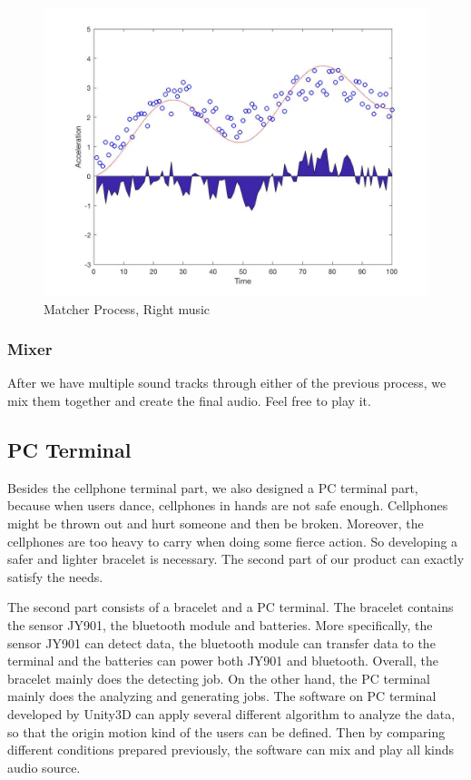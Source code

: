 \begin{figure}[H]
\centering
\includegraphics[width=\widthOfMatcherFigure]{figWR/matcher2}
\caption{Matcher Process, Right music}
\label{matcherStep1}
\end{figure}

\subsubsection{Mixer}

   After we have multiple sound tracks through either of the previous process,
   we mix them together and create the final audio. Feel free to play it.

\subsection{PC Terminal}

Besides the cellphone terminal part, we also designed a PC terminal part,
because when users dance, cellphones in hands are not safe enough. Cellphones
might be thrown out and hurt someone and then be broken. Moreover, the
cellphones are too heavy to carry when doing some fierce action. So developing a
safer and lighter bracelet is necessary. The second part of our product can
exactly satisfy the needs.  

The second part consists of a bracelet and a PC terminal. The bracelet contains
the sensor JY901, the bluetooth module and batteries. More specifically, the
sensor JY901 can detect data, the bluetooth module can transfer data to the
terminal and the batteries can power both JY901 and bluetooth. Overall, the
bracelet mainly does the detecting job. On the other hand, the PC terminal
mainly does the analyzing and generating jobs. The software on PC terminal
developed by Unity3D can apply several different algorithm to analyze the data,
so that the origin motion kind of the users can be defined. Then by comparing
different conditions prepared previously, the software can mix and play all
kinds audio source.   


